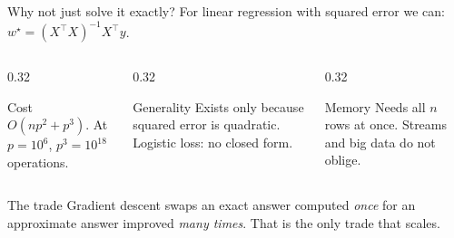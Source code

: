 \documentclass[aspectratio=169]{beamer}
\begin{document}
\begin{frame}[shrink=5]{Why not just solve it exactly?}
  For linear regression with squared error we can:
  $w^\star = (X^\top X)^{-1} X^\top y$.
  \vspace{0.5em}
  \begin{columns}[T]
    \begin{column}{0.32\textwidth}
      \begin{block}{Cost}
        $O(np^2 + p^3)$. At $p = 10^6$, $p^3 = 10^{18}$ operations.
      \end{block}
    \end{column}
    \begin{column}{0.32\textwidth}
      \begin{block}{Generality}
        Exists only because squared error is quadratic. Logistic loss: no
        closed form.
      \end{block}
    \end{column}
    \begin{column}{0.32\textwidth}
      \begin{block}{Memory}
        Needs all $n$ rows at once. Streams and big data do not oblige.
      \end{block}
    \end{column}
  \end{columns}
  \vspace{0.6em}
  \begin{alertblock}{The trade}
    Gradient descent swaps an exact answer computed \emph{once} for an
    approximate answer improved \emph{many times}. That is the only trade that
    scales.
  \end{alertblock}
\end{frame}
\end{document}
